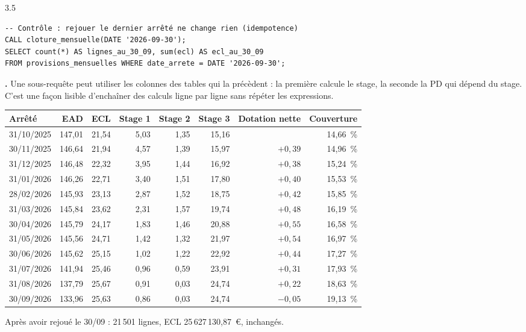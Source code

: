\begin{correction}{3.5}
\begin{lstlisting}[style=long]
-- Contrôle : rejouer le dernier arrêté ne change rien (idempotence)
CALL cloture_mensuelle(DATE '2026-09-30');
SELECT count(*) AS lignes_au_30_09, sum(ecl) AS ecl_au_30_09
FROM provisions_mensuelles WHERE date_arrete = DATE '2026-09-30';
\end{lstlisting}

\textbf{.} Une sous-requête  peut utiliser les colonnes des tables
qui la précèdent : la première calcule le stage, la seconde la PD qui dépend du stage. C'est une façon
lisible d'enchaîner des calculs ligne par ligne sans répéter les expressions.

\begin{resultat}
\begin{center}\small
\begin{tabular}{@{}lrrrrrrr@{}}
\toprule
Arrêté & EAD & ECL & Stage 1 & Stage 2 & Stage 3 & Dotation nette & Couverture \\
\midrule
31/10/2025 & 147,01 & 21,54 & 5,03 & 1,35 & 15,16 & & 14,66~\% \\
30/11/2025 & 146,64 & 21,94 & 4,57 & 1,39 & 15,97 & $+0{,}39$ & 14,96~\% \\
31/12/2025 & 146,48 & 22,32 & 3,95 & 1,44 & 16,92 & $+0{,}38$ & 15,24~\% \\
31/01/2026 & 146,26 & 22,71 & 3,40 & 1,51 & 17,80 & $+0{,}40$ & 15,53~\% \\
28/02/2026 & 145,93 & 23,13 & 2,87 & 1,52 & 18,75 & $+0{,}42$ & 15,85~\% \\
31/03/2026 & 145,84 & 23,62 & 2,31 & 1,57 & 19,74 & $+0{,}48$ & 16,19~\% \\
30/04/2026 & 145,79 & 24,17 & 1,83 & 1,46 & 20,88 & $+0{,}55$ & 16,58~\% \\
31/05/2026 & 145,56 & 24,71 & 1,42 & 1,32 & 21,97 & $+0{,}54$ & 16,97~\% \\
30/06/2026 & 145,62 & 25,15 & 1,02 & 1,22 & 22,92 & $+0{,}44$ & 17,27~\% \\
31/07/2026 & 141,94 & 25,46 & 0,96 & 0,59 & 23,91 & $+0{,}31$ & 17,93~\% \\
31/08/2026 & 137,79 & 25,67 & 0,91 & 0,03 & 24,74 & $+0{,}22$ & 18,63~\% \\
30/09/2026 & 133,96 & 25,63 & 0,86 & 0,03 & 24,74 & $-0{,}05$ & 19,13~\% \\
\bottomrule
\end{tabular}
\end{center}
Après avoir rejoué le 30/09 : 21\,501 lignes, ECL 25\,627\,130,87~€, inchangés.
\end{resultat}


\end{correction}
